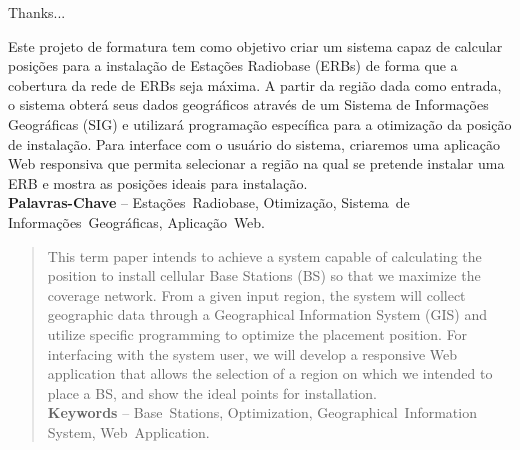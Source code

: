 \documentclass[]{politex}
\begin{document}
\capa
\falsafolhaderosto
\folhaderosto








\begin{agradecimentos}

Thanks...

\end{agradecimentos}




\begin{resumo}
Este projeto de formatura tem como objetivo criar um sistema capaz de calcular
posições para a instalação de Estações Radiobase (ERBs) de forma que a
cobertura da rede de ERBs seja máxima. A partir da região dada como entrada, o
sistema obterá seus dados geográficos através de um Sistema de Informações 
Geográficas (SIG) e utilizará programação específica para a otimização da posição
de instalação. Para interface com o usuário do sistema, criaremos uma aplicação
Web responsiva que permita selecionar a região na qual se pretende instalar uma
ERB e mostra as posições ideais para instalação.
\\[3\baselineskip]
%
\textbf{Palavras-Chave} -- Estações~Radiobase, Otimização, Sistema~de~
Informações~Geográficas, Aplicação~Web.
\end{resumo}


\begin{abstract}
This term paper intends to achieve a system capable of calculating the position
to install cellular Base Stations (BS) so that we maximize the coverage network.
From a given input region, the system will collect geographic data through a
Geographical Information System (GIS) and utilize specific programming to optimize
the placement position. For interfacing with the system user, we will develop a
responsive Web application that allows the selection of a region on which we
intended to place a BS, and show the ideal points for installation.
\\[3\baselineskip]
%
\textbf{Keywords} -- Base~Stations, Optimization, Geographical~Information~
System, Web~Application.
\end{abstract}
\end{document}
